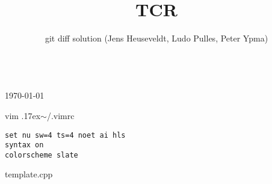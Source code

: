 \documentclass{article}
\title{TCR}
\author{git diff solution (Jens Heuseveldt, Ludo Pulles, Peter Ypma)}
\begin{document}
\begin{center}
	\makeatletter
	\textbf{\@title} \\
	\today \\
	\emph{\@author}
	\makeatother
\end{center}


\begin{center}
vim {\raise.17ex\hbox{$\scriptstyle\sim$}}/.vimrc
\end{center}

\begin{lstlisting}[]
set nu sw=4 ts=4 noet ai hls
syntax on
colorscheme slate
\end{lstlisting}

\begin{center}
template.cpp
\end{center}
\end{document}
